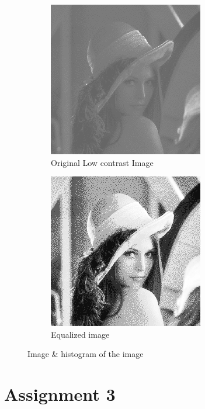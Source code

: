 \documentclass[a4paper,16pt]{article}
\begin{document}
	\begin{figure}[h!]
		\begin{subfigure}[h]{0.6\linewidth}
			\includegraphics[scale=1]{Lenna}
			\caption{Original Low contrast Image}
		\end{subfigure}
		\hfill
		\begin{subfigure}[h]{0.6\linewidth}
			\includegraphics[scale=0.76]{myGray}
			\caption{Equalized image}
		\end{subfigure}%
		\caption{Image \& histogram of the image}
	\end{figure}
	\section{Assignment 3}
\end{document}
